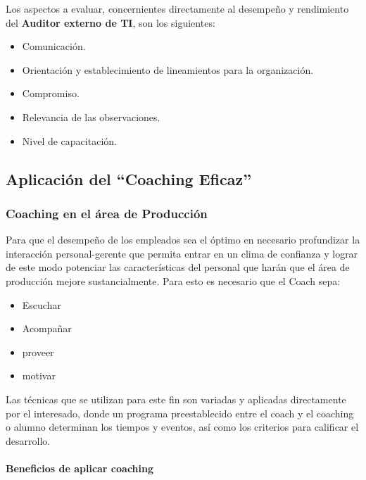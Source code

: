 Los aspectos a evaluar, concernientes directamente al desempeño y rendimiento del \textbf{Auditor externo de TI}, son los siguientes:

\begin{itemize}
    \item Comunicación.
    \item Orientación y establecimiento de lineamientos para la organización.
    \item Compromiso.
    \item Relevancia de las observaciones.
    \item Nivel de capacitación.
\end{itemize}





\newpage

    \subsection{Aplicación del ``Coaching Eficaz''} %
        \subsubsection{Coaching en el área de Producción}
		 Para que el desempeño de los empleados sea el óptimo en necesario profundizar la interacción personal-gerente que permita entrar en un clima de confianza y lograr de este modo potenciar las características del personal que harán que el área de producción mejore sustancialmente. Para esto es necesario que el Coach sepa:
        \begin{itemize}
            \item Escuchar
            \item Acompañar
            \item proveer
            \item motivar
        \end{itemize}
Las técnicas que se utilizan para este fin son variadas y aplicadas directamente por el interesado, donde un programa preestablecido entre el coach y el coaching   o alumno determinan los tiempos y eventos, así como los criterios para calificar el desarrollo. 

\paragraph{Beneficios de aplicar coaching}

